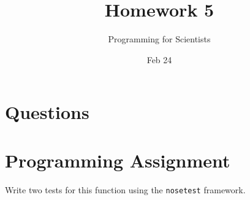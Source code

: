 
\author{Programming for Scientists}
\title{Homework 5}
\date{Feb 24}

\maketitle

\chapter{Questions}

\question %

\question %

\question %

\question %

\question %

\chapter{Programming Assignment}
Write two tests for this function using the \lstinline{nosetest} framework.


